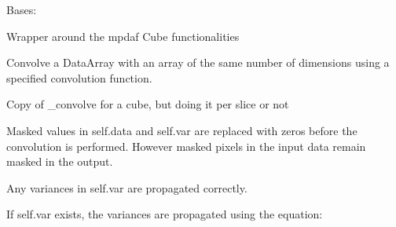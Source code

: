\documentclass[letterpaper,10pt,english]{sphinxmanual}
\begin{document}

\begin{fulllineitems}
\label{\detokenize{api/pymusepipe:pymusepipe.mpdaf_pipe.MuseCube}}
\pysigstartsignatures
{}
\pysigstopsignatures
\sphinxAtStartPar
Bases: 

\sphinxAtStartPar
Wrapper around the mpdaf Cube functionalities

\begin{fulllineitems}
\label{\detokenize{api/pymusepipe:pymusepipe.mpdaf_pipe.MuseCube.astropy_convolve}}
\pysigstartsignatures
{}
\pysigstopsignatures
\sphinxAtStartPar
Convolve a DataArray with an array of the same number of dimensions
using a specified convolution function.

\sphinxAtStartPar
Copy of \_convolve for a cube, but doing it per slice or not

\sphinxAtStartPar
Masked values in self.data and self.var are replaced with
zeros before the convolution is performed. However masked
pixels in the input data remain masked in the output.

\sphinxAtStartPar
Any variances in self.var are propagated correctly.

\sphinxAtStartPar
If self.var exists, the variances are propagated using the equation:

\begin{sphinxVerbatim}[commandchars=\\\{\}]
    
\end{sphinxVerbatim}


\end{fulllineitems}
\end{fulllineitems}
\end{document}
